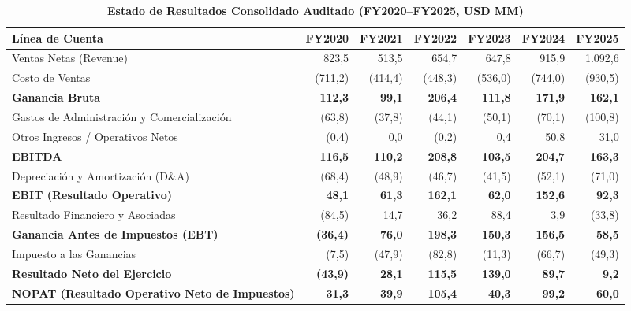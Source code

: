 \documentclass[10pt,a4paper]{article}
\begin{document}
\begin{table}[H]
\centering
\caption{\textbf{Estado de Resultados Consolidado Auditado (FY2020--FY2025, USD MM)}}
\scriptsize
\begin{tabularx}{\textwidth}{Xrrrrrr}
\toprule
\textbf{Línea de Cuenta} & \textbf{FY2020} & \textbf{FY2021} & \textbf{FY2022} & \textbf{FY2023} & \textbf{FY2024} & \textbf{FY2025} \\
\midrule
Ventas Netas (Revenue) & 823,5 & 513,5 & 654,7 & 647,8 & 915,9 & 1.092,6 \\
Costo de Ventas & (711,2) & (414,4) & (448,3) & (536,0) & (744,0) & (930,5) \\
\textbf{Ganancia Bruta} & \textbf{112,3} & \textbf{99,1} & \textbf{206,4} & \textbf{111,8} & \textbf{171,9} & \textbf{162,1} \\
Gastos de Administración y Comercialización & (63,8) & (37,8) & (44,1) & (50,1) & (70,1) & (100,8) \\
Otros Ingresos / Operativos Netos & (0,4) & 0,0 & (0,2) & 0,4 & 50,8 & 31,0 \\
\textbf{EBITDA} & \textbf{116,5} & \textbf{110,2} & \textbf{208,8} & \textbf{103,5} & \textbf{204,7} & \textbf{163,3} \\
Depreciación y Amortización (D\&A) & (68,4) & (48,9) & (46,7) & (41,5) & (52,1) & (71,0) \\
\textbf{EBIT (Resultado Operativo)} & \textbf{48,1} & \textbf{61,3} & \textbf{162,1} & \textbf{62,0} & \textbf{152,6} & \textbf{92,3} \\
Resultado Financiero y Asociadas & (84,5) & 14,7 & 36,2 & 88,4 & 3,9 & (33,8) \\
\textbf{Ganancia Antes de Impuestos (EBT)} & \textbf{(36,4)} & \textbf{76,0} & \textbf{198,3} & \textbf{150,3} & \textbf{156,5} & \textbf{58,5} \\
Impuesto a las Ganancias & (7,5) & (47,9) & (82,8) & (11,3) & (66,7) & (49,3) \\
\textbf{Resultado Neto del Ejercicio} & \textbf{(43,9)} & \textbf{28,1} & \textbf{115,5} & \textbf{139,0} & \textbf{89,7} & \textbf{9,2} \\
\textbf{NOPAT (Resultado Operativo Neto de Impuestos)} & \textbf{31,3} & \textbf{39,9} & \textbf{105,4} & \textbf{40,3} & \textbf{99,2} & \textbf{60,0} \\
\bottomrule
\end{tabularx}
\end{table}
\end{document}
